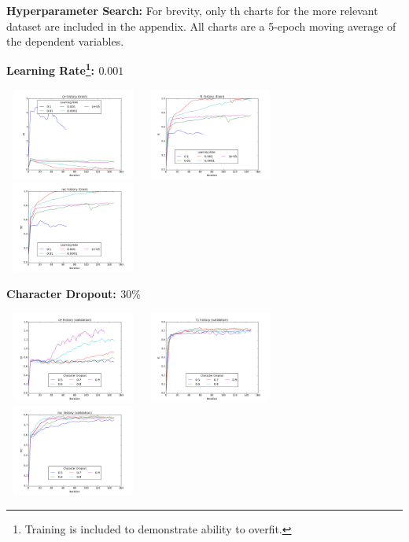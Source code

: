 \documentclass{article} %
\begin{document}
\newpage
\begin{appendices}
\textbf{Hyperparameter Search:} For brevity, only th charts for the more relevant dataset are included in the appendix. All charts are a 5-epoch moving average of the dependent variables.

\textbf{Learning Rate\footnote{Training is included to demonstrate ability to overfit.}: $0.001$}

\includegraphics[width=4.5cm, height=3cm]{ce_history_train_Learning_Rate.png}
\includegraphics[width=4.5cm, height=3cm]{f1_history_train_Learning_Rate.png}
\includegraphics[width=4.5cm, height=3cm]{roc_history_train_Learning_Rate.png}

\textbf{Character Dropout: $30\%$}

\includegraphics[width=4.5cm, height=3cm]{ce_history_validation_Character_Dropout.png}
\includegraphics[width=4.5cm, height=3cm]{f1_history_validation_Character_Dropout.png}
\includegraphics[width=4.5cm, height=3cm]{roc_history_validation_Character_Dropout.png}


\end{appendices}
\end{document}
